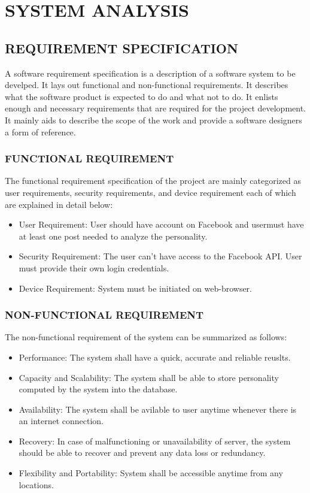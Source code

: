\newpage
\section{SYSTEM ANALYSIS}
\subsection{REQUIREMENT SPECIFICATION}
A software requirement specification is a description of a software system to be develped. It lays out functional and non-functional requirements. It describes what the software product is expected to do and what not to do. It enlists enough and necessary requirements that are required for the project development. It mainly aids to describe the scope of the work and provide a software designers a form of reference.
\subsubsection{FUNCTIONAL REQUIREMENT}
The functional requirement specification of the project are mainly categorized as user requirements, security requirements, and device requirement each of which are explained in detail below:
\begin{itemize}
\item User Requirement: User should have account on Facebook and usermust have at least one post needed to analyze the personality.
\item Security Requirement: The user can't have access to the Facebook API. User must provide their own login credentials.
\item Device Requirement: System must be initiated on web-browser.

\end{itemize}
\subsubsection{NON-FUNCTIONAL REQUIREMENT}
The non-functional requirement of the system can be summarized as follows:
\begin{itemize}
\item Performance: The system shall have a quick, accurate and reliable reuslts.
\item Capacity and Scalability: The system shall be able to store personality computed by the system into the database.
\item Availability: The system shall be avilable to user anytime whenever there is an internet connection.
\item Recovery: In case of malfunctioning or unavailability of server, the system should be able to recover and prevent any data loss or redundancy.
\item Flexibility and Portability: System shall be accessible anytime from any locations. 
\end{itemize}
